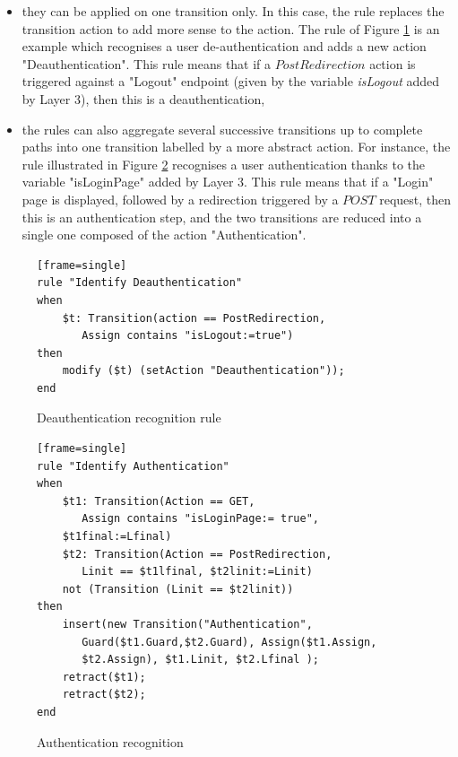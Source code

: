 \begin{itemize}
\item they can be applied on one transition only. In this case,
the rule replaces the transition action to add more sense to the
action. The rule of Figure \ref{fig:rule:deauth} is an example
which recognises a user de-authentication and adds a new action
"Deauthentication". This rule means that if a $PostRedirection$
action is triggered against a "Logout" endpoint (given by the
variable \emph{isLogout} added by Layer 3), then this is a
deauthentication,

\item the rules can also aggregate several successive transitions
up to complete paths into one transition labelled by a more
abstract action. For instance, the rule illustrated in Figure
\ref{fig:rule:auth} recognises a user authentication thanks to
the variable "isLoginPage" added by Layer 3. This rule means that
if a "Login" page is displayed, followed by a redirection
triggered by a $POST$ request, then this is an authentication
step, and the two transitions are reduced into a single one
composed of the action "Authentication".

\end{itemize}
\begin{figure}[ht]
\begin{center}
\begin{scriptsize}
\begin{verbatim}[frame=single]
rule "Identify Deauthentication"
when
    $t: Transition(action == PostRedirection,
       Assign contains "isLogout:=true")
then
    modify ($t) (setAction "Deauthentication"));
end
\end{verbatim}
\end{scriptsize}
\end{center}
\caption {Deauthentication recognition rule} \label{fig:rule:deauth}
\end{figure}


\begin{figure}[ht]
\begin{center}
\begin{scriptsize}
\begin{verbatim}[frame=single]
rule "Identify Authentication"
when
    $t1: Transition(Action == GET,
       Assign contains "isLoginPage:= true",
    $t1final:=Lfinal)
    $t2: Transition(Action == PostRedirection,
       Linit == $t1lfinal, $t2linit:=Linit)
    not (Transition (Linit == $t2linit))
then
    insert(new Transition("Authentication",
       Guard($t1.Guard,$t2.Guard), Assign($t1.Assign,
       $t2.Assign), $t1.Linit, $t2.Lfinal );
    retract($t1);
    retract($t2);
end
\end{verbatim}
\end{scriptsize}
\caption {Authentication recognition} \label{fig:rule:auth}
\end{center}
\end{figure}

